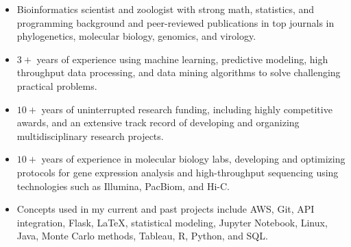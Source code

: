 \documentclass[11pt, letterpaper, roman]{moderncv}
\begin{document}
    \begin{itemize}
         \item Bioinformatics scientist and zoologist with strong math, statistics, and programming background and peer-reviewed publications in top journals in phylogenetics, molecular biology, genomics, and virology.
        \item $3+$ years of experience using machine learning, predictive modeling, high throughput data processing, and data mining algorithms to solve challenging practical problems.
        \item $10+$ years of uninterrupted research funding, including highly competitive awards, and an extensive track record of developing and organizing multidisciplinary research projects.
        \item $10+$ years of experience in molecular biology labs, developing and optimizing protocols for gene expression analysis and high-throughput sequencing using technologies such as Illumina, PacBiom, and Hi-C.
        \item Concepts used in my current and past projects include AWS, Git, API integration, Flask, \LaTeX, statistical modeling, Jupyter Notebook, Linux, Java, Monte Carlo methods, Tableau, R, Python, and SQL.
    \end{itemize}


\end{document}
